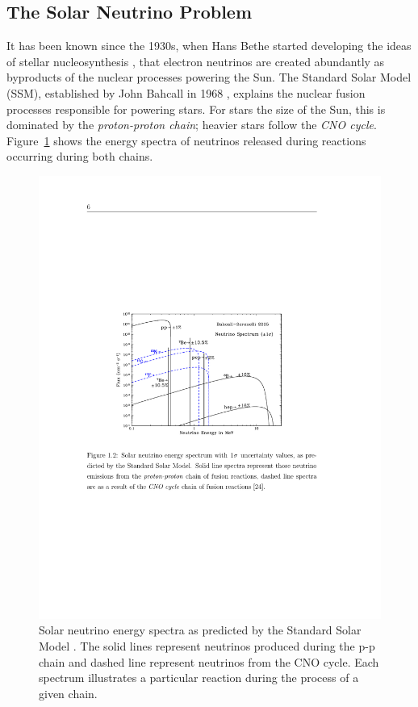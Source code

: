 \subsection{The Solar Neutrino Problem}\label{SolarNeutrinoProblem}

It has been known since the 1930s, when Hans Bethe started developing the ideas of stellar nucleosynthesis \cite{Bethe1939}, that electron neutrinos are created abundantly as byproducts of the nuclear processes powering the Sun.  The Standard Solar Model (SSM), established by John Bahcall in 1968 \cite{Bahcall1968}, explains the nuclear fusion processes responsible for powering stars.  For stars the size of the Sun, this is dominated by the \textit{proton-proton chain}; heavier stars follow the \textit{CNO cycle}.  Figure~\ref{fig:SolarNeutrinoCycles} shows the energy spectra of neutrinos released during reactions occurring during both chains.

\begin{figure}
\centering
  \includegraphics[width=12cm]{SolarNeutrinoCycles.pdf}
  \caption[Solar neutrino energy spectra as predicted by the Standard Solar Model.]{Solar neutrino energy spectra as predicted by the Standard Solar Model \cite{Bahcall2005}.  The solid lines represent neutrinos produced during the p-p chain and dashed line represent neutrinos from the CNO cycle.  Each spectrum illustrates a particular reaction during the process of a given chain.}
  \label{fig:SolarNeutrinoCycles}
\end{figure}

